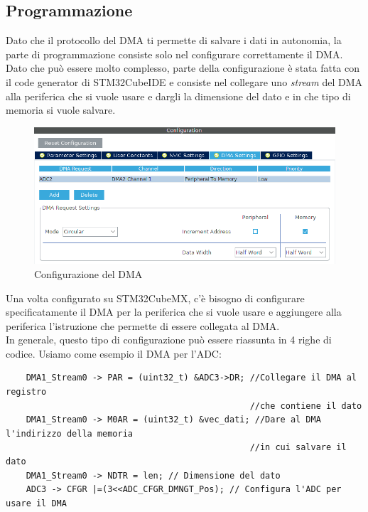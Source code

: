 \subsection{Programmazione}
Dato che il protocollo del DMA ti permette di salvare i dati in autonomia, la parte di programmazione consiste solo nel configurare correttamente il DMA.\\



Dato che può essere molto complesso, parte della configurazione è stata fatta con il code generator di STM32CubeIDE e consiste nel collegare uno \textit{stream} del DMA alla periferica che si vuole usare e dargli la dimensione del dato e in che tipo di memoria si vuole salvare.\\

\begin{figure}
    \centering
    \includegraphics[width=\linewidth]{microcontrollore/assets/dma_configuration.png}
    \caption{Configurazione del DMA}
    \label{fig:DMA}
\end{figure}

Una volta configurato su STM32CubeMX, c'è bisogno di configurare specificatamente il DMA per la periferica che si vuole usare e aggiungere alla periferica l'istruzione che permette di essere collegata al DMA.\\

In generale, questo tipo di configurazione può essere riassunta in 4 righe di codice. Usiamo come esempio il DMA per l'ADC:

\begin{verbatim}
    DMA1_Stream0 -> PAR = (uint32_t) &ADC3->DR; //Collegare il DMA al registro
                                                //che contiene il dato
    DMA1_Stream0 -> M0AR = (uint32_t) &vec_dati; //Dare al DMA l'indirizzo della memoria
                                                //in cui salvare il dato
    DMA1_Stream0 -> NDTR = len; // Dimensione del dato
    ADC3 -> CFGR |=(3<<ADC_CFGR_DMNGT_Pos); // Configura l'ADC per usare il DMA
\end{verbatim}

